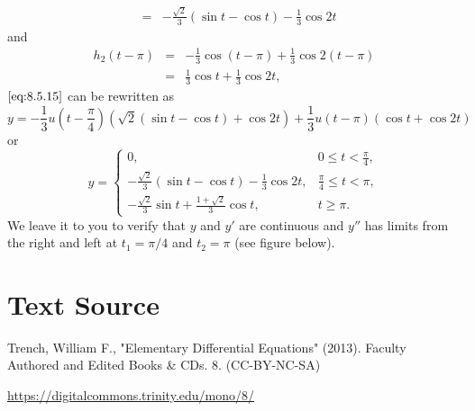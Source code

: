 \documentclass{ximera}
\begin{document}
\begin{example}
\begin{explanation}
\begin{eqnarray*}
&=&-\frac{\sqrt{2}}{3} (\sin t-\cos t)-\frac{1}{3}\cos2t
\end{eqnarray*}
and
\begin{eqnarray*}
h_2(t-\pi)&=&-\frac{1}{3}\cos (t-\pi)+\frac{1}{3}\cos2(t-\pi)\\
&=&\frac{1}{3}\cos t+\frac{1}{3}\cos2t,
\end{eqnarray*}
$\eqref{eq:8.5.15}$ can be rewritten as
$$
y=-\frac{1}{3}u\left(t-\frac{\pi}{4}\right)\left(\sqrt{2}(\sin
t-\cos t)+\cos2t\right)
+ \frac{1}{3} u(t-\pi) (\cos t+\cos2t)
$$
or
\begin{equation}\label{eq:8.5.16}
y=\left\{\begin{array}{cl}
0,&0\leq t<\frac{\pi}{4},\\
-\frac{\sqrt{2}}{3}(\sin t-\cos t)-\frac{1}{3}\cos2t,&\frac{\pi}{4}\leq t<\pi,\\
-\frac{\sqrt{2}}{3}\sin t+\frac{1+\sqrt{2}}{3}\cos t ,&t\geq\pi.
\end{array}\right.
\end{equation}
We leave it to you to verify that $y$ and $y'$ are continuous and
$y''$ has limits from the right and left at $t_1=\pi/4$ and $t_2=\pi$
(see figure below).

\begin{center}
\end{center}


\end{explanation}
\end{example}

\section*{Text Source}
Trench, William F., "Elementary Differential Equations" (2013). Faculty Authored and Edited Books \& CDs. 8. (CC-BY-NC-SA)

\href{https://digitalcommons.trinity.edu/mono/8/}{https://digitalcommons.trinity.edu/mono/8/}
\end{document}
